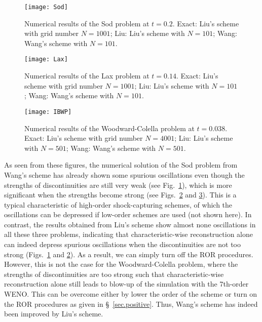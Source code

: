 \documentclass[review]{elsarticle}
\begin{document}
\begin{figure}
  \centering
  \texttt{[image: Sod]}\\
  \caption{Numerical results of the Sod problem at $t=0.2$. Exact: Liu's scheme with grid number $N=1001$; Liu: Liu's scheme with $N=101$; Wang: Wang's scheme with $N=101$.} \label{fig.Sod}
\end{figure}

\begin{figure}
  \centering
  \texttt{[image: Lax]}\\
  \caption{Numerical results of the Lax problem at $t=0.14$. Exact: Liu's scheme with grid number $N=1001$; Liu: Liu's scheme with $N=101$; Wang: Wang's scheme with $N=101$.} \label{fig.Lax}
\end{figure}

\begin{figure}
  \centering
  \texttt{[image: IBWP]}\\
  \caption{Numerical results of the Woodward-Colella problem at $t=0.038$. Exact: Liu's scheme with grid number $N=4001$; Liu: Liu's scheme with $N=501$; Wang: Wang's scheme with $N=501$.}\label{fig.IBWP}
\end{figure}

As seen from these figures, the numerical solution of the Sod problem from Wang's scheme has already shown some spurious oscillations even though the strengths of discontinuities are still very weak (see Fig.~\ref{fig.Sod}), which is more significant when the strengths become strong (see Figs.~\ref{fig.Lax} and \ref{fig.IBWP}). This is a typical characteristic of high-order shock-capturing schemes, of which the oscillations can be depressed if low-order schemes are used (not shown here). In contrast, the results obtained from Liu's scheme show almost none oscillations in all these three problems, indicating that characteristic-wise reconstruction alone can indeed depress spurious oscillations when the discontinuities are not too strong (Figs.~\ref{fig.Sod} and \ref{fig.Lax}). As a result, we can simply turn off the ROR procedures. However, this is not the case for the Woodward-Colella problem, where the strengths of discontinuities are too strong such that characteristic-wise reconstruction alone still leads to blow-up of the simulation with the 7th-order WENO. This can be overcome either by lower the order of the scheme or turn on the ROR procedures as given in \S~\ref{sec.positive}. Thus, Wang's scheme has indeed been improved by Liu's scheme.
\end{document}
